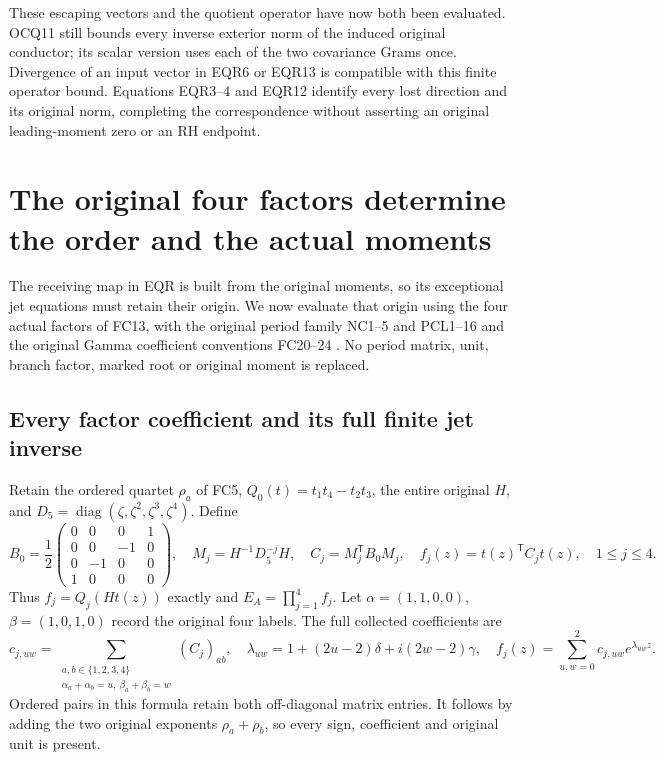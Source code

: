 \documentclass[11pt]{article}
\begin{document}
These escaping vectors and the quotient operator have now both been
evaluated. OCQ11 still bounds every inverse exterior norm of the
induced original conductor; its scalar version uses each of the
two covariance Grams once. Divergence of an input vector in
EQR6 or EQR13 is compatible with this finite operator bound.
Equations EQR3--4 and EQR12 identify every lost direction and its
original norm, completing the correspondence without asserting an
original leading-moment zero or an RH endpoint.


\section{The original four factors determine the order and the actual moments}
The receiving map in EQR is built from the original moments, so its
exceptional jet equations must retain their origin. We now evaluate
that origin using the four actual factors of FC13, with the original
period family NC1--5 and PCL1--16 \cite{NC,Cumulative,PCLOriginal} and the original Gamma
coefficient conventions FC20--24 \cite{WCF}. No period matrix, unit,
branch factor, marked root or original moment is replaced.

\subsection{Every factor coefficient and its full finite jet inverse}
Retain the ordered quartet $\rho_a$ of FC5, $Q_0(t)=t_1t_4-t_2t_3$,
the entire original $H$, and $D_5=\operatorname{diag}(\zeta,\zeta^2,
\zeta^3,\zeta^4)$. Define
\[
 B_0=\frac12\begin{pmatrix}0&0&0&1\\0&0&-1&0\\
 0&-1&0&0\\1&0&0&0\end{pmatrix},\quad
 M_j=H^{-1}D_5^{-j}H,\quad C_j=M_j^{\mathsf T}B_0M_j,
 \quad f_j(z)=t(z)^{\mathsf T}C_jt(z),\quad 1\le j\le4.
 \tag{OFM1}
\]
Thus $f_j=Q_j(Ht(z))$ exactly and $E_A=\prod_{j=1}^4f_j$.
Let $\alpha=(1,1,0,0)$, $\beta=(1,0,1,0)$ record the original
four labels. The full collected coefficients are
\[
 c_{j,uw}=\sum_{\substack{a,b\in\{1,2,3,4\}\\
       \alpha_a+\alpha_b=u,\ \beta_a+\beta_b=w}}(C_j)_{ab},
 \quad \lambda_{uw}=1+(2u-2)\delta+i(2w-2)\gamma,
 \quad f_j(z)=\sum_{u,w=0}^2c_{j,uw}e^{\lambda_{uw}z}.
 \tag{OFM2}
\]
Ordered pairs in this formula retain both off-diagonal matrix entries.
It follows by adding the two original exponents $\rho_a+\rho_b$,
so every sign, coefficient and original unit is present.
\end{document}
